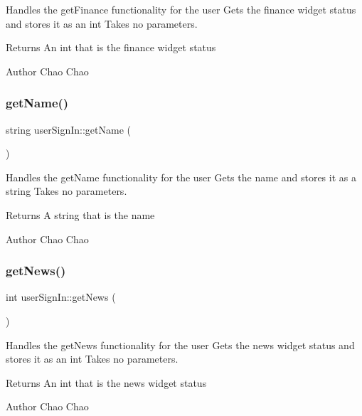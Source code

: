 Handles the get\+Finance functionality for the user  Gets the finance widget status and stores it as an int  Takes no parameters. 

\begin{DoxyReturn}{Returns}
An int that is the finance widget status 
\end{DoxyReturn}
\begin{DoxyAuthor}{Author}
Chao Chao 
\end{DoxyAuthor}
\mbox{\label{classuser_sign_in_a6b0ff4eb19a71e5f891da4c779aa2027}} 
\subsubsection{\texorpdfstring{get\+Name()}{getName()}}
{\footnotesize\ttfamily string user\+Sign\+In\+::get\+Name (\begin{DoxyParamCaption}{ }\end{DoxyParamCaption})}



Handles the get\+Name functionality for the user  Gets the name and stores it as a string  Takes no parameters. 

\begin{DoxyReturn}{Returns}
A string that is the name 
\end{DoxyReturn}
\begin{DoxyAuthor}{Author}
Chao Chao 
\end{DoxyAuthor}
\mbox{\label{classuser_sign_in_a6a22de24799069874818c381a9764bb7}} 
\subsubsection{\texorpdfstring{get\+News()}{getNews()}}
{\footnotesize\ttfamily int user\+Sign\+In\+::get\+News (\begin{DoxyParamCaption}{ }\end{DoxyParamCaption})}



Handles the get\+News functionality for the user  Gets the news widget status and stores it as an int  Takes no parameters. 

\begin{DoxyReturn}{Returns}
An int that is the news widget status 
\end{DoxyReturn}
\begin{DoxyAuthor}{Author}
Chao Chao 
\end{DoxyAuthor}
\mbox{\label{classuser_sign_in_a993651684c3af6d06869d30d62decbbd}} 
